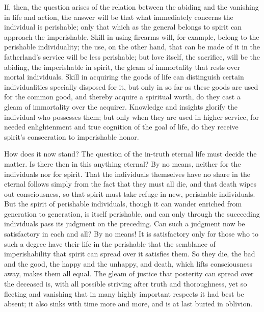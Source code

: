 \documentclass[12pt]{book}
\begin{document}
If, then, the question arises of the relation between the abiding and the vanishing in life and
action, the answer will be that what immediately concerns the individual is perishable; only that
which as the general belongs to spirit can approach the imperishable. Skill in using firearms will,
for example, belong to the perishable individuality; the use, on the other hand, that can be made
of it in the fatherland's service will be less perishable; but love itself, the sacrifice, will be
the abiding, the imperishable in spirit, the gleam of immortality that rests over mortal
individuals. Skill in acquiring the goods of life can distinguish certain individualities specially
disposed for it, but only in so far as these goods are used for the common good, and thereby acquire
a spiritual worth, do they cast a gleam of immortality over the acquirer. Knowledge and insights
glorify the individual who possesses them; but only when they are used in higher service, for needed
enlightenment and true cognition of the goal of life, do they receive spirit's consecration to
imperishable honor.

How does it now stand? The question of the in-truth eternal life must decide the matter. Is there
then in this anything eternal? By no means, neither for the individuals nor for spirit. That the
individuals themselves have no share in the eternal follows simply from the fact that they must all
die, and that death wipes out consciousness, so that spirit must take refuge in new, perishable
individuals. But the spirit of perishable individuals, though it can wander enriched from generation
to generation, is itself perishable, and can only through the succeeding individuals pass its
judgment on the preceding. Can such a judgment now be satisfactory in each and all? By no means! It
is satisfactory only for those who to such a degree have their life in the perishable that the
semblance of imperishability that spirit can spread over it satisfies them. So they die, the bad
and the good, the happy and the unhappy, and death, which lifts consciousness away, makes them all
equal. The gleam of justice that posterity can spread over the deceased is, with all possible
striving after truth and thoroughness, yet so fleeting and vanishing that in many highly important
respects it had best be absent; it also sinks with time more and more, and is at last buried in
oblivion.
\end{document}
